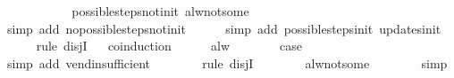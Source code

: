 \begin{isabellebody}
\ \ \ \ \ \isamarkupfalse%
\isanewline
\ \ \ \ \isamarkupfalse%
\ possible{\isacharunderscore}steps{\isacharunderscore}not{\isacharunderscore}init\ alw{\isacharunderscore}not{\isacharunderscore}some\isanewline
\ \ \ \ \ \isamarkupfalse%
\ {\isacharparenleft}simp\ add{\isacharcolon}\ no{\isacharunderscore}possible{\isacharunderscore}steps{\isacharunderscore}not{\isacharunderscore}init{\isacharparenright}\isanewline
\ \ \ \ \isamarkupfalse%
\ {\isacharparenleft}simp\ add{\isacharcolon}\ possible{\isacharunderscore}steps{\isacharunderscore}init\ updates{\isacharunderscore}init{\isacharparenright}\isanewline
\ \ \ \ \isamarkupfalse%
\ {\isacharparenleft}rule\ disjI{}{\isacharparenright}\isanewline
\ \ \isamarkupfalse%
{\isacharparenleft}coinduction{\isacharparenright}\isanewline
\ \ \ \ \isamarkupfalse%
\ alw\isanewline
\ \ \ \ \isamarkupfalse%
\ \isamarkupfalse%
\ {\isacharquery}case\isanewline
\ \ \ \ \ \ \isamarkupfalse%
\ {\isacharparenleft}simp\ add{\isacharcolon}\ vend{\isacharunderscore}insufficient{\isacharparenright}\isanewline
\ \ \ \ \ \ \isamarkupfalse%
\ {\isacharparenleft}rule\ disjI{}{\isacharparenright}\isanewline
\ \ \ \ \ \ \isamarkupfalse%
\ alw{\isacharunderscore}not{\isacharunderscore}some\isanewline
\ \ \ \ \ \ \isamarkupfalse%
\ simp\isanewline
\ \ \isamarkupfalse%
\isanewline
{}\isamarkupfalse%
%
\endisatagproof
{\isafoldproof}%
%
\isadelimproof
%
\endisadelimproof
%
%
\isadelimproof
\ \ %
\endisadelimproof
%
\isatagproof
{}\isamarkupfalse%

\end{isabellebody}
